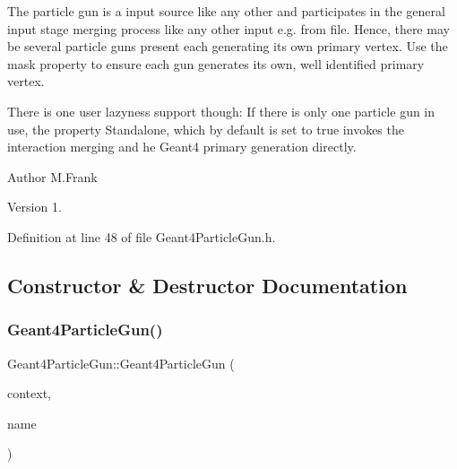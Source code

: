 The particle gun is a input source like any other and participates in the general input stage merging process like any other input e.\+g. from file. Hence, there may be several particle guns present each generating it\textquotesingle{}s own primary vertex. Use the mask property to ensure each gun generates it\textquotesingle{}s own, well identified primary vertex.

There is one \textquotesingle{}user lazyness\textquotesingle{} support though\+: If there is only one particle gun in use, the property \textquotesingle{}Standalone\textquotesingle{}, which by default is set to true invokes the interaction merging and he Geant4 primary generation directly.

\begin{DoxyAuthor}{Author}
M.\+Frank 
\end{DoxyAuthor}
\begin{DoxyVersion}{Version}
1. 
\end{DoxyVersion}


Definition at line 48 of file Geant4\+Particle\+Gun.\+h.



\subsection{Constructor \& Destructor Documentation}
\hypertarget{class_d_d4hep_1_1_simulation_1_1_geant4_particle_gun_ae5bb5f3dd378bc79d03bff0fc723c46d}{}\label{class_d_d4hep_1_1_simulation_1_1_geant4_particle_gun_ae5bb5f3dd378bc79d03bff0fc723c46d} 
\subsubsection{\texorpdfstring{Geant4\+Particle\+Gun()}{Geant4ParticleGun()}}
{\footnotesize\ttfamily Geant4\+Particle\+Gun\+::\+Geant4\+Particle\+Gun (\begin{DoxyParamCaption}\item[{\hyperlink{class_d_d4hep_1_1_simulation_1_1_geant4_context}{Geant4\+Context} $\ast$}]{context,  }\item[{const std\+::string \&}]{name }\end{DoxyParamCaption})}



